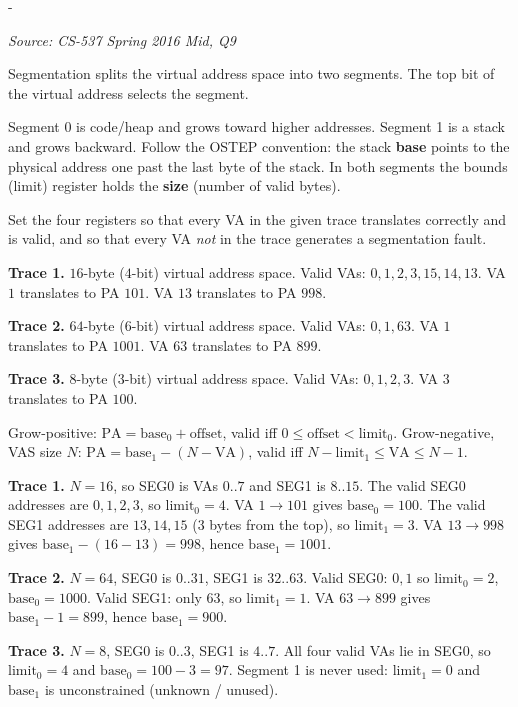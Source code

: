 \documentclass[11pt,a4paper]{article}
\makeatletter
\newcommand{\keepspace}[1]{\par\penalty-100\begingroup
  \setlength{\dimen@}{#1}\dimen@ii\pagegoal\advance\dimen@ii-\pagetotal
  \ifdim\dimen@>\dimen@ii\ifdim\dimen@ii>\z@\vfil\fi\break\fi\endgroup}
\newcounter{qn}[section]
\newenvironment{Qn}[4]{%
  \refstepcounter{qn}\keepspace{7\baselineskip}%
  \begin{tcolorbox}[qboxstyle, title={Q\thesection.\theqn\ \ [#1 \textbar\ #2]\ \ #4}]%
  {\footnotesize\color{g3}\textit{Source: #3}}\par\smallskip%
}{%
  \end{tcolorbox}%
}
\newenvironment{Sol}{%
  \begin{tcolorbox}[sboxstyle, title={Solution}]%
}{%
  \end{tcolorbox}\vspace{0.35em}%
}
\makeatother
\begin{document}
\begin{Qn}{Hard}{Lect 10}{CS-537 Spring 2016 Mid, Q9}{Set two-segment base/limit registers from a VA/PA trace}
Segmentation splits the virtual address space into two segments. The
top bit of the virtual address selects the segment.

Segment 0 is code/heap and grows toward higher addresses.
Segment 1 is a stack and grows backward. Follow the OSTEP convention:
the stack \textbf{base} points to the physical address one past the last
byte of the stack. In both segments the bounds (limit) register holds
the \textbf{size} (number of valid bytes).

Set the four registers so that every VA in the given trace translates
correctly and is valid, and so that every VA \emph{not} in the trace
generates a segmentation fault.

\textbf{Trace 1.} $16$-byte ($4$-bit) virtual address space.
Valid VAs: $0,1,2,3,15,14,13$.
VA $1$ translates to PA $101$.
VA $13$ translates to PA $998$.

\textbf{Trace 2.} $64$-byte ($6$-bit) virtual address space.
Valid VAs: $0,1,63$.
VA $1$ translates to PA $1001$.
VA $63$ translates to PA $899$.

\textbf{Trace 3.} $8$-byte ($3$-bit) virtual address space.
Valid VAs: $0,1,2,3$.
VA $3$ translates to PA $100$.
\end{Qn}
\begin{Sol}
Grow-positive: $\mathrm{PA}=\mathrm{base}_0+\mathrm{offset}$, valid iff
$0\le\mathrm{offset}<\mathrm{limit}_0$.
Grow-negative, VAS size $N$:
$\mathrm{PA}=\mathrm{base}_1-(N-\mathrm{VA})$, valid iff
$N-\mathrm{limit}_1\le\mathrm{VA}\le N-1$.

\textbf{Trace 1.} $N=16$, so SEG0 is VAs $0..7$ and SEG1 is $8..15$.
The valid SEG0 addresses are $0,1,2,3$, so $\mathrm{limit}_0=4$.
VA $1\to 101$ gives $\mathrm{base}_0=100$.
The valid SEG1 addresses are $13,14,15$ ($3$ bytes from the top), so
$\mathrm{limit}_1=3$.
VA $13\to 998$ gives $\mathrm{base}_1-(16-13)=998$, hence
$\mathrm{base}_1=1001$.

\textbf{Trace 2.} $N=64$, SEG0 is $0..31$, SEG1 is $32..63$.
Valid SEG0: $0,1$ so $\mathrm{limit}_0=2$, $\mathrm{base}_0=1000$.
Valid SEG1: only $63$, so $\mathrm{limit}_1=1$.
VA $63\to 899$ gives $\mathrm{base}_1-1=899$, hence
$\mathrm{base}_1=900$.

\textbf{Trace 3.} $N=8$, SEG0 is $0..3$, SEG1 is $4..7$.
All four valid VAs lie in SEG0, so $\mathrm{limit}_0=4$ and
$\mathrm{base}_0=100-3=97$. Segment 1 is never used:
$\mathrm{limit}_1=0$ and $\mathrm{base}_1$ is unconstrained
(unknown / unused).
\end{Sol}
\end{document}
